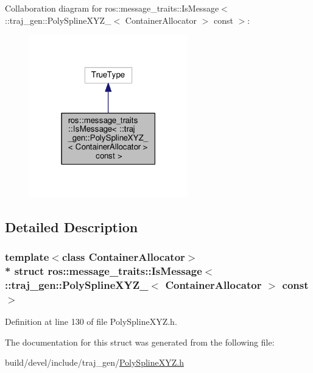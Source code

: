 Collaboration diagram for ros\+:\+:message\+\_\+traits\+:\+:Is\+Message$<$ \+:\+:traj\+\_\+gen\+:\+:Poly\+Spline\+X\+Y\+Z\+\_\+$<$ Container\+Allocator $>$ const $>$\+:
\nopagebreak
\begin{figure}[H]
\begin{center}
\leavevmode
\includegraphics[width=195pt]{structros_1_1message__traits_1_1_is_message_3_01_1_1traj__gen_1_1_poly_spline_x_y_z___3_01_conta7ca8cae56f127327730b67b18a053aac}
\end{center}
\end{figure}


\subsection{Detailed Description}
\subsubsection*{template$<$class Container\+Allocator$>$\\*
struct ros\+::message\+\_\+traits\+::\+Is\+Message$<$ \+::traj\+\_\+gen\+::\+Poly\+Spline\+X\+Y\+Z\+\_\+$<$ Container\+Allocator $>$ const  $>$}



Definition at line 130 of file Poly\+Spline\+X\+Y\+Z.\+h.



The documentation for this struct was generated from the following file\+:\begin{DoxyCompactItemize}
\item 
build/devel/include/traj\+\_\+gen/\hyperlink{_poly_spline_x_y_z_8h}{Poly\+Spline\+X\+Y\+Z.\+h}\end{DoxyCompactItemize}
